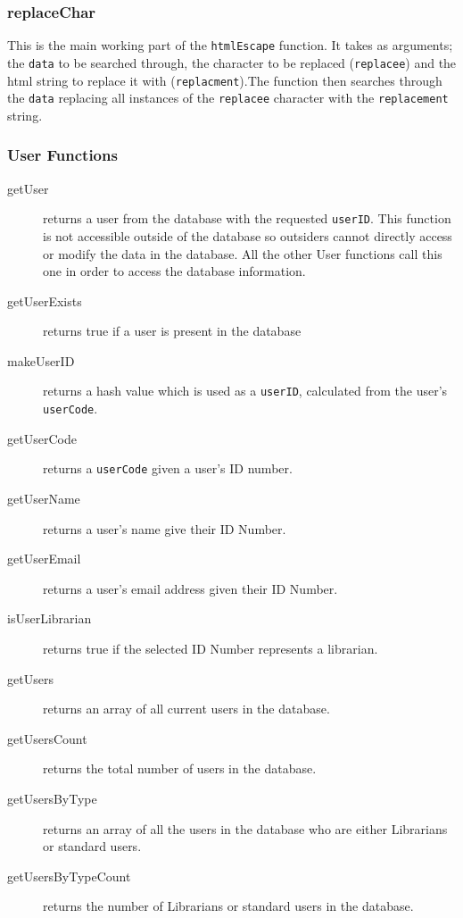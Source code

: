 \documentclass{article}
\begin{document}
\subsubsection*{replaceChar}
This is the main working part of the \verb|htmlEscape| function. It takes as arguments; the \verb|data| to be searched through, the character to be replaced (\verb|replacee|) and the html string to replace it with (\verb|replacment|).The function then searches through the \verb|data| replacing all instances of the \verb|replacee| character with the \verb|replacement| string.

\subsubsection{User Functions}
\begin{description}
\item[getUser] returns a user from the database with the requested \verb|userID|. This function is not accessible outside of the database so outsiders cannot directly access or modify the data in the database. All the other User functions call this one in order to access the database information.
\item[getUserExists] returns true if a user is present in the database
\item[makeUserID] returns a hash value which is used as a \verb|userID|, calculated from the user's \verb|userCode|.
\item[getUserCode] returns a \verb|userCode| given a user's ID number.
\item[getUserName] returns a user's name give their ID Number.
\item[getUserEmail] returns a user's email address given their ID Number.
\item[isUserLibrarian] returns true if the selected ID Number represents a librarian.
\item[getUsers] returns an array of all current users in the database.
\item[getUsersCount] returns the total number of users in the database.
\item[getUsersByType] returns an array of all the users in the database who are either Librarians or standard users.
\item[getUsersByTypeCount] returns the number of Librarians or standard users in the database.
\end{description}
\end{document}
